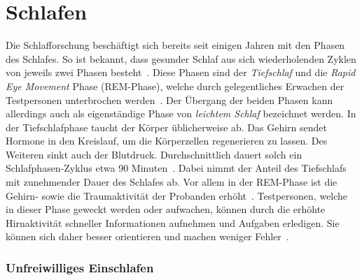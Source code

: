 \section{Schlafen}\label{sec:relatedWork.schlafen}

Die Schlafforschung beschäftigt sich bereits seit einigen Jahren mit den Phasen des Schlafes. So ist bekannt, dass gesunder Schlaf aus sich wiederholenden Zyklen von jeweils zwei Phasen besteht~\cite{broughton1968sleep}.
Diese Phasen sind der \textit{Tiefschlaf} und die \textit{Rapid Eye Movement} Phase (REM-Phase), welche durch gelegentliches Erwachen der Testpersonen unterbrochen werden~\cite{broughton1968sleep}. Der Übergang der beiden Phasen kann allerdings auch als eigenständige Phase von \textit{leichtem Schlaf} bezeichnet werden. 
In der Tiefschlafphase taucht der Körper üblicherweise ab. Das Gehirn sendet Hormone in den Kreislauf, um die Körperzellen regenerieren zu lassen. Des Weiteren sinkt auch der Blutdruck.
Durchschnittlich dauert solch ein Schlafphasen-Zyklus etwa 90 Minuten~\cite{broughton1968sleep}. Dabei nimmt der Anteil des Tiefschlafs mit zunehmender Dauer des Schlafes ab.
Vor allem in der REM-Phase ist die Gehirn- sowie die Traumaktivität der Probanden erhöht~\cite{gackenbach1991herrscher, broughton1968sleep}. Testpersonen, welche in dieser Phase geweckt werden oder aufwachen, können durch die erhöhte Hirnaktivität schneller Informationen aufnehmen und Aufgaben erledigen. Sie können sich daher besser orientieren und machen weniger Fehler~\cite{aschoff1985perception}. 

\subsubsection{Unfreiwilliges Einschlafen}

